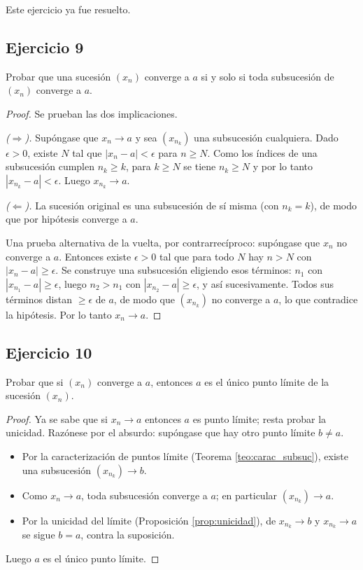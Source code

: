 \documentclass[11pt, a4paper]{article}
\begin{document}
Este ejercicio ya fue resuelto.

\subsection*{Ejercicio 9}

Probar que una sucesión $(x_n)$ converge a $a$ si y solo si toda subsucesión de $(x_n)$ converge a
$a$.

\begin{proof}
Se prueban las dos implicaciones.

\textit{($\Rightarrow$).} Supóngase que $x_n \to a$ y sea $(x_{n_k})$ una subsucesión cualquiera.
Dado $\epsilon > 0$, existe $N$ tal que $|x_n - a| < \epsilon$ para $n \ge N$. Como los índices de
una subsucesión cumplen $n_k \ge k$, para $k \ge N$ se tiene $n_k \ge N$ y por lo tanto
$|x_{n_k} - a| < \epsilon$. Luego $x_{n_k} \to a$.

\textit{($\Leftarrow$).} La sucesión original es una subsucesión de sí misma (con $n_k = k$), de modo
que por hipótesis converge a $a$.

Una prueba alternativa de la vuelta, por contrarrecíproco: supóngase que $x_n$ no converge a $a$.
Entonces existe $\epsilon > 0$ tal que para todo $N$ hay $n > N$ con $|x_n - a| \ge \epsilon$. Se
construye una subsucesión eligiendo esos términos: $n_1$ con $|x_{n_1} - a| \ge \epsilon$, luego
$n_2 > n_1$ con $|x_{n_2} - a| \ge \epsilon$, y así sucesivamente. Todos sus términos distan
$\ge \epsilon$ de $a$, de modo que $(x_{n_k})$ no converge a $a$, lo que contradice la hipótesis. Por
lo tanto $x_n \to a$.
\end{proof}

\subsection*{Ejercicio 10}

Probar que si $(x_n)$ converge a $a$, entonces $a$ es el único punto límite de la sucesión $(x_n)$.

\begin{proof}
Ya se sabe que si $x_n \to a$ entonces $a$ es punto límite; resta probar la unicidad. Razónese por el
absurdo: supóngase que hay otro punto límite $b \neq a$.
\begin{itemize}
    \item Por la caracterización de puntos límite (Teorema \ref{teo:carac_subsuc}), existe una
    subsucesión $(x_{n_k}) \to b$.
    \item Como $x_n \to a$, toda subsucesión converge a $a$; en particular $(x_{n_k}) \to a$.
    \item Por la unicidad del límite (Proposición \ref{prop:unicidad}), de $x_{n_k} \to b$ y
    $x_{n_k} \to a$ se sigue $b = a$, contra la suposición.
\end{itemize}
Luego $a$ es el único punto límite.
\end{proof}
\end{document}
